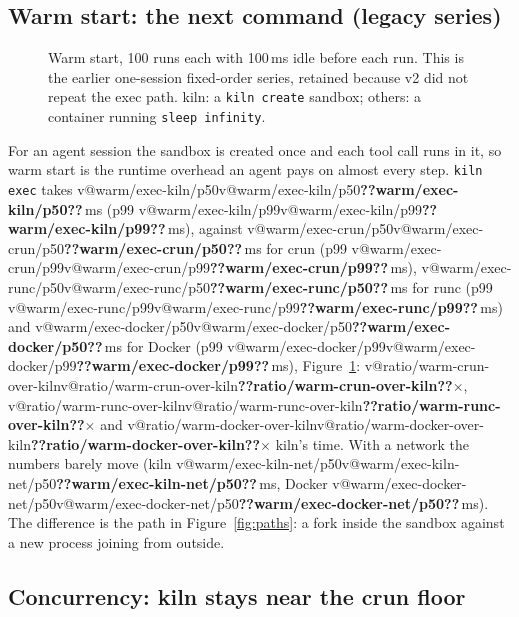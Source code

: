 \documentclass[10pt,letterpaper]{article}
\makeatletter
\newcommand{\code}[1]{\texttt{#1}}
\newcommand{\V}[1]{\ifcsname v@#1\endcsname\csname v@#1\endcsname\else\textbf{??#1??}\fi}
\newcommand{\ms}[1]{\V{#1}\,ms}
\makeatother
\begin{document}
\subsection{Warm start: the next command (legacy series)}

\begin{figure}[H]
\centering
{}
\caption{Warm start, 100 runs each with 100\,ms idle before each run. This is
the earlier one-session fixed-order series, retained because v2 did not repeat
the exec path. kiln: a \code{kiln create} sandbox; others: a container running
\code{sleep infinity}.}
\label{fig:warm}
\end{figure}

For an agent session the sandbox is created once and each tool call runs in it,
so warm start is the runtime overhead an agent pays on almost every step.
\code{kiln exec} takes \ms{warm/exec-kiln/p50} (p99 \ms{warm/exec-kiln/p99}),
against \ms{warm/exec-crun/p50} for crun (p99 \ms{warm/exec-crun/p99}),
\ms{warm/exec-runc/p50} for runc (p99 \ms{warm/exec-runc/p99}) and
\ms{warm/exec-docker/p50} for Docker (p99 \ms{warm/exec-docker/p99}),
Figure~\ref{fig:warm}: \V{ratio/warm-crun-over-kiln}$\times$,
\V{ratio/warm-runc-over-kiln}$\times$ and \V{ratio/warm-docker-over-kiln}$\times$
kiln's time. With a network the numbers barely move (kiln
\ms{warm/exec-kiln-net/p50}, Docker \ms{warm/exec-docker-net/p50}). The
difference is the path in Figure~\ref{fig:paths}: a fork inside the sandbox
against a new process joining from outside.

\subsection{Concurrency: kiln stays near the crun floor}
\end{document}
